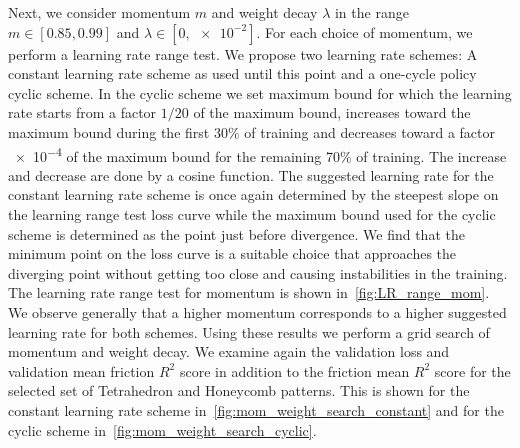 Next, we consider momentum $m$ and weight decay $\lambda$ in the range $m \in
[0.85, 0.99]$ and $\lambda \in [0, \num{e-2}]$. For each choice of momentum, we
perform a learning rate range test. We propose two learning rate schemes: A
constant learning rate scheme as used until this point and a one-cycle policy cyclic scheme. In the cyclic scheme we set maximum bound for which the learning rate starts from a factor $1/20$ of the maximum bound, increases toward the maximum bound during the first $30\%$ of training and decreases toward a factor \num{e-4} of the maximum bound for the remaining 70\% of training. The increase
and decrease are done by a cosine function. The suggested learning rate for the
constant learning rate scheme is once again determined by the steepest slope on
the learning range test loss curve while the maximum bound used for the
cyclic scheme is determined as the point just before divergence. We find that
the minimum point on the loss curve is a suitable choice that approaches the
diverging point without getting too close and causing instabilities in the
training. The learning rate range test for momentum is shown
in~\cref{fig:LR_range_mom}. We observe generally that a higher momentum
corresponds to a higher suggested learning rate for both schemes. Using these
results we perform a grid search of momentum and weight decay. We examine again
the validation loss and validation mean friction $R^2$ score in addition to the
friction mean $R^2$ score for the selected set of Tetrahedron and Honeycomb
patterns. This is shown for the constant learning rate scheme
in~\cref{fig:mom_weight_search_constant} and for the cyclic scheme
in~\cref{fig:mom_weight_search_cyclic}.

